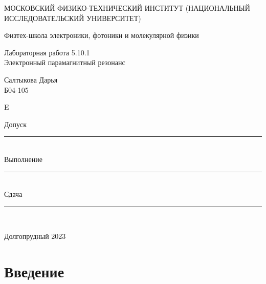 \documentclass[a4paper,12pt]{article} %
\begin{document}
\newenvironment{lines}[1][\textwidth] %
{
\newcolumntype{E}{>{}p{#1}<{\hrulefill}} %
\begin{flushright} %
\begin{tabular}[h]{E} %
}
{\end{tabular}\end{flushright}
}
	
	\begin{titlepage}
	\begin{center}
		{\large МОСКОВСКИЙ ФИЗИКО-ТЕХНИЧЕСКИЙ ИНСТИТУТ (НАЦИОНАЛЬНЫЙ ИССЛЕДОВАТЕЛЬСКИЙ УНИВЕРСИТЕТ)}
	\end{center}
	\begin{center}
		{\large Физтех-школа электроники, фотоники и молекулярной физики}
	\end{center}
	
	
	\vspace{4.5cm}
	{\huge
		\begin{center}
			{Лабораторная работа 5.10.1}\\
			 Электронный парамагнитный резонанс
		\end{center}
	}
	\vspace{2cm}
	\begin{flushright}
		{\LARGE Салтыкова Дарья \\
			\vspace{0.5cm}
			Б04-105}
	\end{flushright}
	
	\vspace{0.5cm}
	
	\begin{lines}[.5
	\textwidth]
  {\LARGE Допуск} \rule{6.5cm}{0.25pt} \vspace{0.5cm}\\
 {\LARGE Выполнение} \rule{3cm}{0.25pt}\vspace{0.5cm} \\ {\LARGE Сдача} \rule{3cm}{0.25pt} \\ %
\end{lines}
	\vspace{8cm}
	\begin{center}
		Долгопрудный 2023
	\end{center}
\end{titlepage}

\section{Введение}
\end{document}
